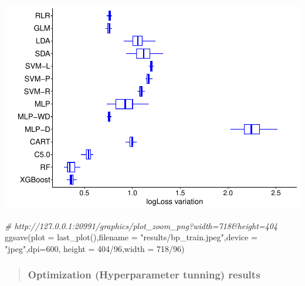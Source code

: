 \documentclass[
]{article}
\newenvironment{Shaded}{\begin{snugshade}}{\end{snugshade}}
\newcommand{\AttributeTok}[1]{\textcolor[rgb]{0.77,0.63,0.00}{#1}}
\newcommand{\CommentTok}[1]{\textcolor[rgb]{0.56,0.35,0.01}{\textit{#1}}}
\newcommand{\DecValTok}[1]{\textcolor[rgb]{0.00,0.00,0.81}{#1}}
\newcommand{\FunctionTok}[1]{\textcolor[rgb]{0.00,0.00,0.00}{#1}}
\newcommand{\NormalTok}[1]{#1}
\newcommand{\SpecialCharTok}[1]{\textcolor[rgb]{0.00,0.00,0.00}{#1}}
\newcommand{\StringTok}[1]{\textcolor[rgb]{0.31,0.60,0.02}{#1}}
\begin{document}
\begin{center}\includegraphics{sl-inf-cairs-2301_files/figure-latex/trainResults-1} \end{center}

\begin{Shaded}
\begin{Highlighting}[]
\CommentTok{\# http://127.0.0.1:20991/graphics/plot\_zoom\_png?width=718\&height=404}
\FunctionTok{ggsave}\NormalTok{(}\AttributeTok{plot =} \FunctionTok{last\_plot}\NormalTok{(),}\AttributeTok{filename =} \StringTok{"results/bp\_train.jpeg"}\NormalTok{,}\AttributeTok{device =} \StringTok{"jpeg"}\NormalTok{,}\AttributeTok{dpi=}\DecValTok{600}\NormalTok{,}
       \AttributeTok{height =} \DecValTok{404}\SpecialCharTok{/}\DecValTok{96}\NormalTok{,}\AttributeTok{width =} \DecValTok{718}\SpecialCharTok{/}\DecValTok{96}\NormalTok{)}
\end{Highlighting}
\end{Shaded}

\begin{quote}
\hypertarget{optimization-hyperparameter-tunning-results}{%
\subsubsection{Optimization (Hyperparameter tunning)
results}\label{optimization-hyperparameter-tunning-results}}
\end{quote}
\end{document}
